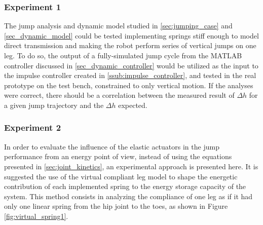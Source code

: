 \subsubsection{Experiment 1} %
\label{ssub:experiment_1}
The jump analysis and dynamic model studied in \ref{sec:jumping_case} and \ref{sec_dynamic_model} could be tested implementing springs stiff enough to model direct transmission and making the robot perform series of vertical jumps on one leg.
To do so, the output of a fully-simulated jump cycle from the MATLAB controller discussed in \ref{sec_dynamic_controller} would be utilized as the input to the impulse controller created in \ref{ssub:impulse_controller}, and tested in the real prototype on the test bench, constrained to only vertical motion.
If the analyses were correct, there should be a correlation between the measured result of $\Delta h$ for a given jump trajectory and the $\Delta h$ expected.



\subsubsection{Experiment 2} %
\label{ssub:experiment_2}
In order to evaluate the influence of the elastic actuators in the jump performance from an energy point of view, instead of using the equations presented in \ref{sec:joint_kinetics}, an experimental approach is presented here.
It is suggested the use of the virtual compliant leg model to shape the energetic contribution of each implemented spring to the energy storage capacity of the system.
This method consists in analyzing the compliance of one leg as if it had only one linear spring from the hip joint to the toes, as shown in Figure \ref{fig:virtual_spring1}.

